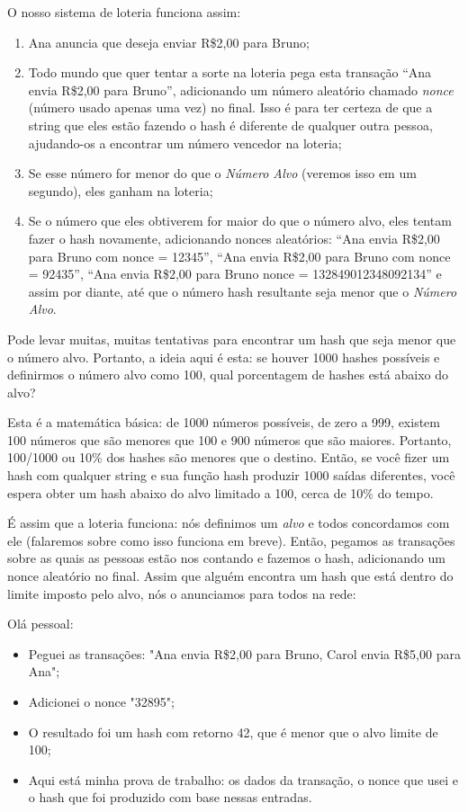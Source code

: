 O nosso sistema de loteria funciona assim:

\begin{enumerate}
\item Ana anuncia que deseja enviar R\$2,00 para Bruno;
\item Todo mundo que quer tentar a sorte na loteria pega esta transação “Ana envia R\$2,00 para Bruno”, adicionando um número aleatório chamado \textit{nonce} (número usado apenas uma vez) no final. Isso é para ter certeza de que a string que eles estão fazendo o hash é diferente de qualquer outra pessoa, ajudando-os a encontrar um número vencedor na loteria;
\item Se esse número for menor do que o \textit{Número Alvo} (veremos isso em um segundo), eles ganham na loteria;
\item Se o número que eles obtiverem for maior do que o número alvo, eles tentam fazer o hash novamente, adicionando nonces aleatórios: “Ana envia R\$2,00 para Bruno com nonce = 12345”, “Ana envia R\$2,00 para Bruno com nonce = 92435”, “Ana envia R\$2,00 para Bruno nonce = 132849012348092134” e assim por diante, até que o número hash resultante seja menor que o \textit{Número Alvo}.
\end{enumerate}

Pode levar muitas, muitas tentativas para encontrar um hash que seja menor que o número alvo. Portanto, a ideia aqui é esta: se houver 1000 hashes possíveis e definirmos o número alvo como 100, qual porcentagem de hashes está abaixo do alvo?

Esta é a matemática básica: de 1000 números possíveis, de zero a 999, existem 100 números que são menores que 100 e 900 números que são maiores. Portanto, 100/1000 ou 10\% dos hashes são menores que o destino. Então, se você fizer um hash com qualquer string e sua função hash produzir 1000 saídas diferentes, você espera obter um hash abaixo do alvo limitado a 100, cerca de 10\% do tempo.

É assim que a loteria funciona: nós definimos um \textit{alvo} e todos concordamos com ele (falaremos sobre como isso funciona em breve). Então, pegamos as transações sobre as quais as pessoas estão nos contando e fazemos o hash, adicionando um nonce aleatório no final. Assim que alguém encontra um hash que está dentro do limite imposto pelo alvo, nós o anunciamos para todos na rede:

Olá pessoal:
\begin{itemize}
\item Peguei as transações: "Ana envia R\$2,00 para Bruno, Carol envia R\$5,00 para Ana";
\item Adicionei o nonce "32895";
\item O resultado foi um hash com retorno 42, que é menor que o alvo limite de 100;
\item Aqui está minha prova de trabalho: os dados da transação, o nonce que usei e o hash que foi produzido com base nessas entradas.
\end{itemize}

